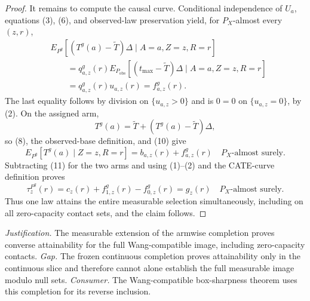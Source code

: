 \documentclass{article}
\begin{document}
\begin{proof}
It remains to compute the causal curve.  Conditional independence of \(U_a\), equations (3), (6), and observed-law preservation yield, for \(P_X\)-almost every \((z,r)\),
\[
\begin{aligned}
&E_{P^g}\!\left[(T^g(a)-\widetilde T)\Delta
\mid A=a,Z=z,R=r\right]\\
&\qquad=q^g_{a,z}(r)
E_{P_{\mathrm{obs}}}\!\left[(t_{\max}-\widetilde T)\Delta
\mid A=a,Z=z,R=r\right]\\
&\qquad=q^g_{a,z}(r)u_{a,z}(r)
=f^g_{a,z}(r).
\end{aligned}
\tag{10}
\]
The last equality follows by division on \(\{u_{a,z}>0\}\) and is \(0=0\) on \(\{u_{a,z}=0\}\), by (2).  On the assigned arm,
\[
T^g(a)=\widetilde T+(T^g(a)-\widetilde T)\Delta,
\]
so (8), the observed-base definition, and (10) give
\[
E_{P^g}[T^g(a)\mid Z=z,R=r]
=b_{a,z}(r)+f^g_{a,z}(r)
\quad P_X\text{-almost surely}.
\tag{11}
\]
Subtracting (11) for the two arms and using (1)--(2) and the CATE-curve definition proves
\[
\tau_z^{P^g}(r)
=c_z(r)+f^g_{1,z}(r)-f^g_{0,z}(r)
=g_z(r)
\quad P_X\text{-almost surely}.
\tag{12}
\]
Thus one law attains the entire measurable selection simultaneously, including on all zero-capacity contact sets, and the claim follows.
\end{proof}
\par\smallskip\noindent \textit{Justification.} The measurable extension of the armwise completion proves converse attainability for the full Wang-compatible image, including zero-capacity contacts. \textit{Gap.} The frozen continuous completion proves attainability only in the continuous slice and therefore cannot alone establish the full measurable image modulo null sets. \textit{Consumer.} The Wang-compatible box-sharpness theorem uses this completion for its reverse inclusion.
\end{document}

